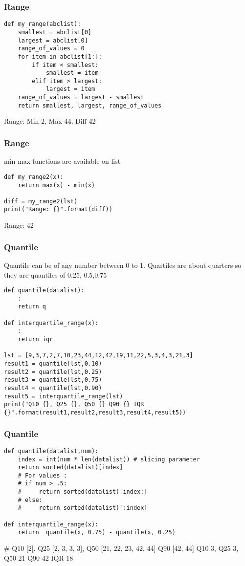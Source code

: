 \begin{frame}[fragile]\frametitle{Range}
\begin{lstlisting}
def my_range(abclist):
    smallest = abclist[0]
    largest = abclist[0]
    range_of_values = 0
    for item in abclist[1:]:
        if item < smallest:
            smallest = item
        elif item > largest:
            largest = item
    range_of_values = largest - smallest
    return smallest, largest, range_of_values
\end{lstlisting}
Range: Min 2, Max 44, Diff 42
\end{frame}

\begin{frame}[fragile]\frametitle{Range}
min max functions are available on list
\begin{lstlisting}
def my_range2(x):
	return max(x) - min(x)

diff = my_range2(lst)
print("Range: {}".format(diff))	
\end{lstlisting}
Range: 42
\end{frame}

\begin{frame}[fragile]\frametitle{Quantile}
Quantile can be of any number between 0 to 1. Quartiles are about quarters so they are quantiles of 0.25, 0.5,0.75

\begin{lstlisting}
def quantile(datalist):
	:
	return q

def interquartile_range(x):
	:
	return iqr
	
lst = [9,3,7,2,7,10,23,44,12,42,19,11,22,5,3,4,3,21,3]
result1 = quantile(lst,0.10)
result2 = quantile(lst,0.25)
result3 = quantile(lst,0.75)
result4 = quantile(lst,0.90)
result5 = interquartile_range(lst)
print("Q10 {}, Q25 {}, Q50 {} Q90 {} IQR {}".format(result1,result2,result3,result4,result5))
\end{lstlisting}
\end{frame}

\begin{frame}[fragile]\frametitle{Quantile}
\begin{lstlisting}
def quantile(datalist,num):
    index = int(num * len(datalist)) # slicing parameter
    return sorted(datalist)[index]
    # For values :
    # if num > .5:
    #     return sorted(datalist)[index:]
    # else:
    #     return sorted(datalist)[:index]

def interquartile_range(x):
    return	quantile(x, 0.75) - quantile(x, 0.25)
\end{lstlisting}
\# Q10 [2], Q25 [2, 3, 3, 3], Q50 [21, 22, 23, 42, 44] Q90 [42, 44]
Q10 3, Q25 3, Q50 21 Q90 42 IQR 18
\end{frame}


